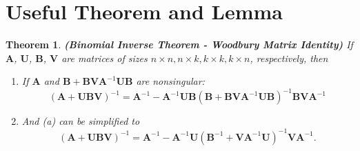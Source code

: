 \documentclass[11pt]{article}
\theoremstyle{plain} %
\newtheorem{theorem}{Theorem}[section]
\theoremstyle{remark}
\begin{document}
\begin{center}

  {}
\end{center}
\vspace{2em}

\tableofcontents

\section*{Useful Theorem and Lemma}
\begin{theorem}
  \textbf{(Binomial Inverse Theorem - Woodbury Matrix Identity)} \label{theorem: Woodbury}If $\mathbf{A}$, $\mathbf{U}$,
  $\mathbf{B}$, $\mathbf{V}$ are matrices of sizes $n \times n, n \times k, k \times k, k \times n$,
  respectively, then
  \begin{enumerate}[label = (\alph*)]
    \item If $\mathbf{A}$ and $\mathbf{B}+\mathbf{B V A}^{-1}
            \mathbf{U B}$ are nonsingular:
          $$
            (\mathbf{A}+\mathbf{U B V})^{-1}=\mathbf{A}^{-1}-\mathbf{A}^{-1} \mathbf{U B}\left(\mathbf{B}+\mathbf{B V A}^{-1} \mathbf{U B}\right)^{-1} \mathbf{B V A}^{-1}
          $$
    \item And (a) can be simplified to
          $$
            (\mathbf{A}+\mathbf{U B V})^{-1}=\mathbf{A}^{-1}-\mathbf{A}^{-1} \mathbf{U}\left(\mathbf{B}^{-1}+\mathbf{V A}^{-1} \mathbf{U}\right)^{-1} \mathbf{V A}^{-1} .
          $$
  \end{enumerate}
\end{theorem}
\end{document}
